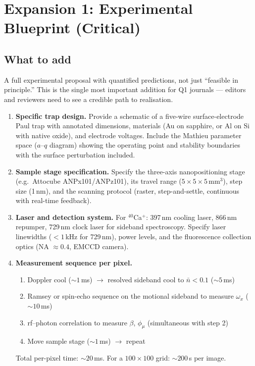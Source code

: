 \documentclass[11pt,a4paper]{article}
\begin{document}
\section{Expansion 1: Experimental Blueprint (Critical)}

\subsection{What to add}

A full experimental proposal with quantified predictions, not just ``feasible in principle.'' This is the single most important addition for Q1 journals --- editors and reviewers need to see a credible path to realisation.

\begin{enumerate}[label=\textbf{E\arabic*}, leftmargin=*]

    \item \textbf{Specific trap design.} Provide a schematic of a five-wire surface-electrode Paul trap with annotated dimensions, materials (Au on sapphire, or Al on Si with native oxide), and electrode voltages. Include the Mathieu parameter space ($a$--$q$ diagram) showing the operating point and stability boundaries with the surface perturbation included.

    \item \textbf{Sample stage specification.} Specify the three-axis nanopositioning stage (e.g.\ Attocube ANPx101/ANPz101), its travel range ($5 \times 5 \times 5$\,mm$^3$), step size (1\,nm), and the scanning protocol (raster, step-and-settle, continuous with real-time feedback).

    \item \textbf{Laser and detection system.} For ${}^{40}$Ca$^+$: 397\,nm cooling laser, 866\,nm repumper, 729\,nm clock laser for sideband spectroscopy. Specify laser linewidths ($<1$\,kHz for 729\,nm), power levels, and the fluorescence collection optics (NA $\approx 0.4$, EMCCD camera).

    \item \textbf{Measurement sequence per pixel.}
    \begin{enumerate}
        \item Doppler cool ($\sim 1$\,ms) $\to$ resolved sideband cool to $\bar{n} < 0.1$ ($\sim 5$\,ms)
        \item Ramsey or spin-echo sequence on the motional sideband to measure $\omega_x$ ($\sim 10$\,ms)
        \item rf--photon correlation to measure $\beta$, $\phi_\mu$ (simultaneous with step 2)
        \item Move sample stage ($\sim 1$\,ms) $\to$ repeat
    \end{enumerate}
    Total per-pixel time: $\sim 20$\,ms. For a $100 \times 100$ grid: $\sim 200$\,s per image.


\end{enumerate}
\end{document}
